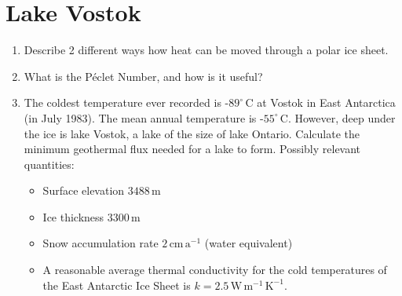 \documentclass[parskip=half]{scrartcl}
\newcommand{\cels}[1]{\ensuremath{#1^{\circ}\,\mathrm{C}}}
\begin{document}
\section{Lake Vostok}

\begin{enumerate}
\item Describe 2 different ways how heat can be moved through a polar ice sheet.
\item What is the P\'eclet Number, and how is it useful?
\item The coldest temperature ever recorded is -\cels{89} at Vostok in East Antarctica (in July 1983). The mean annual temperature is -\cels{55}. However, deep under the ice is lake Vostok, a lake of the size of lake Ontario. Calculate the minimum geothermal flux needed for a lake to form. Possibly relevant quantities:
  \begin{itemize}
  \item Surface elevation $3488\,\mathrm{m}$
  \item Ice thickness $3300\,\mathrm{m}$
  \item Snow accumulation rate $2\,\mathrm{cm}\,\mathrm{a}^{-1}$ (water equivalent)
  \item A reasonable average thermal conductivity for the cold temperatures of the East Antarctic Ice Sheet is $k = 2.5\,\mathrm{W}\,\mathrm{m}^{-1}\,\mathrm{K}^{-1}$.
  \end{itemize}
\end{enumerate}



\end{document}
